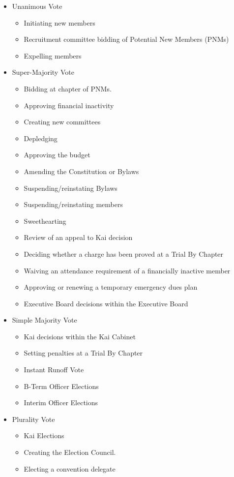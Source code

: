 \begin{itemize}
	\item[] Unanimous Vote
		\begin{itemize}
			\item Initiating new members
			\item Recruitment committee bidding of Potential New Members (PNMs)
			\item Expelling members
		\end{itemize}
	\item[] Super-Majority Vote
		\begin{itemize}
			\item Bidding at chapter of PNMs.
			\item Approving financial inactivity
			\item Creating new committees
			\item Depledging
			\item Approving the budget
			\item Amending the Constitution or Bylaws
			\item Suspending/reinstating Bylaws
			\item Suspending/reinstating members
			\item Sweethearting
			\item Review of an appeal to Kai decision
			\item Deciding whether a charge has been proved at a Trial By
				Chapter
			\item Waiving an attendance requirement of a financially inactive
				member
			\item Approving or renewing a temporary emergency dues plan
			\item Executive Board decisions within the Executive Board
		\end{itemize}
	\item[] Simple Majority Vote
		\begin{itemize}
			\item Kai decisions within the Kai Cabinet
			\item Setting penalties at a Trial By Chapter
			\item Instant Runoff Vote
			\item B-Term Officer Elections
			\item Interim Officer Elections
		\end{itemize}
	\item[] Plurality Vote
		\begin{itemize}
			\item Kai Elections
			\item Creating the Election Council.
			\item Electing a convention delegate
		\end{itemize}
\end{itemize}

